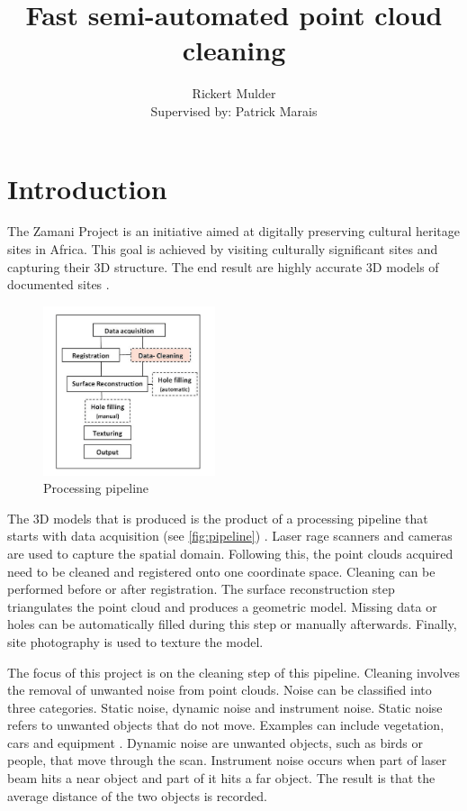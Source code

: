 \documentclass[10pt,twocolumn]{article}
\title{Fast semi-automated point cloud cleaning}
\author{Rickert Mulder\\ Supervised by: Patrick Marais}
\date{}
\begin{document}
\maketitle

\section{Introduction}
The Zamani Project is an initiative aimed at digitally preserving cultural heritage sites in Africa. This goal is achieved by visiting culturally significant sites and capturing their 3D structure. The end result are highly accurate 3D models of documented sites \cite{Ruther2011}.

\begin{figure}[htb]
\centering
\includegraphics[width=0.45\textwidth]{pics/pipeline.png}
\caption{Processing pipeline \cite{Ruther2011}}
\label{fig:pipeline}
\end{figure}


The 3D models that is produced is the product of a processing pipeline that starts with data acquisition (see \autoref{fig:pipeline}) \cite{Ruther2011}. Laser rage scanners and cameras are used to capture the spatial domain. Following this, the point clouds acquired need to be cleaned and registered onto one coordinate space. Cleaning can be performed before or after registration. The surface reconstruction step triangulates the point cloud and produces a geometric model. Missing data or holes can be automatically filled during this step or manually afterwards. Finally, site photography is used to texture the model.

The focus of this project is on the cleaning step of this pipeline. Cleaning involves the removal of unwanted noise from point clouds. Noise can be classified into three categories. Static noise, dynamic noise and instrument noise. Static noise refers to unwanted objects that do not move. Examples can include vegetation, cars and equipment \cite{Held2012}. Dynamic noise are unwanted objects, such as birds or people, that move through the scan. Instrument noise occurs when part of laser beam hits a near object and part of it hits a far object. The result is that the average distance of the two objects is recorded.
\end{document}
